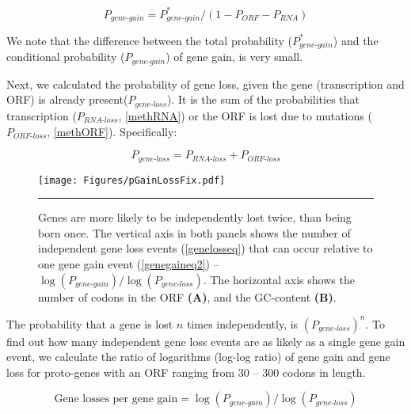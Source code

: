 \documentclass[12pt,a4paper]{article}
\begin{document}
\begin{equation}
P_\textit{gene-gain} = P_\textit{gene-gain}^*/(1-P_\textit{ORF} - P_\textit{RNA})
\label{genegaineq2}
\end{equation}

We note that the difference between the total probability ($P_\textit{gene-gain}^*$) and the conditional probability ($P_\textit{gene-gain}$) of gene gain, is very small.

Next, we calculated the probability of gene loss, given the gene (transcription and ORF) is already present($P_\textit{gene-loss}$). It is the sum of the probabilities that transcription ($P_\textit{RNA-loss}$, \autoref{methRNA}) or the ORF is lost due to mutations ($P_\textit{ORF-loss}$, \autoref{methORF}). Specifically:

\begin{equation}
P_\textit{gene-loss} = P_\textit{RNA-loss} + P_\textit{ORF-loss}
\label{genelosseq}
\end{equation}

\begin{figure}[!t]
\centering
\texttt{[image: Figures/pGainLossFix.pdf]}
\caption{Genes are more likely to be independently lost twice, than being born once. The vertical axis in both panels shows the number of independent gene loss events (\autoref{genelosseq}) that can occur relative to one gene gain event (\autoref{genegaineq2}) -- $\log(P_\textit{gene-gain})/\log(P_\textit{gene-loss})$. The horizontal axis shows the number of codons in the ORF \textbf{(A)}, and the GC-content \textbf{(B)}.}
\label{gainlossprob}
\vspace{1ex}
\hrule
\end{figure}

The probability that a gene is lost $n$ times independently, is $(P_\textit{gene-loss})^{n}$. To find out how many independent gene loss events are as likely as a single gene gain event, we calculate the ratio of logarithms (log-log ratio) of gene gain and gene loss for proto-genes with an ORF ranging from 30 -- 300 codons in length.

$$ \text{Gene losses per gene gain} = \log(P_\textit{gene-gain})/\log(P_\textit{gene-loss})$$
\end{document}

